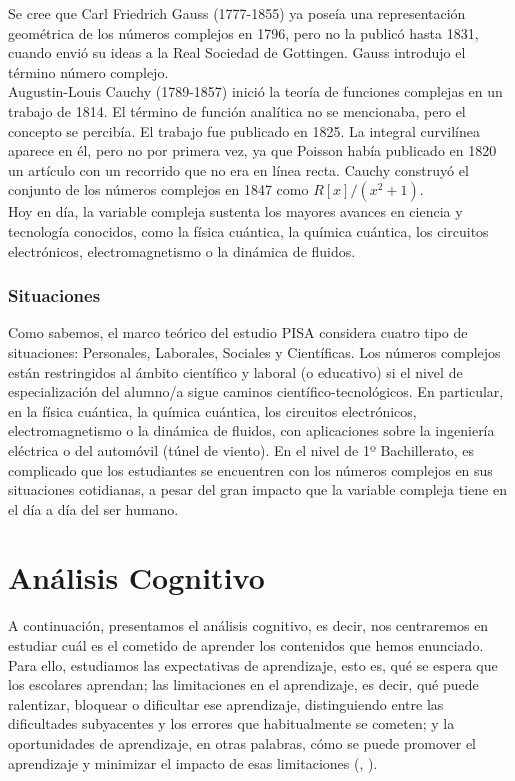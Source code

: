\documentclass[../main.tex]{memoir}
\begin{document}
Se cree que Carl Friedrich Gauss (1777-1855) ya poseía una representación geométrica de los números complejos en 1796, pero no la publicó hasta 1831, cuando envió su ideas a la Real Sociedad de Gottingen. Gauss introdujo el término número complejo. \\

Augustin-Louis Cauchy (1789-1857) inició la teoría de funciones complejas en un trabajo de 1814. El término de función analítica no se mencionaba, pero el concepto se percibía. El trabajo fue publicado en 1825. La integral curvilínea aparece en él, pero no por primera vez, ya que Poisson había publicado en 1820 un artículo con un recorrido que no era en línea recta. Cauchy construyó el conjunto de los números complejos en 1847 como $R[x]/(x^2+1)$. \\

Hoy en día, la variable compleja sustenta los mayores avances en ciencia y tecnología conocidos, como la física cuántica, la química cuántica, los circuitos electrónicos, electromagnetismo o la  dinámica de fluidos.


\subsubsection{Situaciones}

Como sabemos, el marco teórico del estudio PISA considera cuatro tipo de situaciones: Personales, Laborales, Sociales y Científicas. Los números complejos están restringidos al ámbito científico y laboral (o educativo) si el nivel de especialización del alumno/a sigue caminos científico-tecnológicos. En particular, en la física cuántica, la química cuántica, los circuitos electrónicos, electromagnetismo o la dinámica de fluidos, con aplicaciones sobre la ingeniería eléctrica o del automóvil (túnel de viento). En el nivel de 1º Bachillerato, es complicado que los estudiantes se encuentren con los números complejos en sus situaciones cotidianas, a pesar del gran impacto que la variable compleja tiene en el día a día del ser humano.


\section{Análisis Cognitivo}

A continuación, presentamos el análisis cognitivo, es decir, nos centraremos en estudiar cuál es el cometido de aprender los contenidos que hemos enunciado. Para ello, estudiamos las expectativas de aprendizaje, esto es, qué se espera que los escolares aprendan; las limitaciones en el aprendizaje, es decir, qué puede ralentizar, bloquear o dificultar ese aprendizaje, distinguiendo entre las dificultades subyacentes y los errores que habitualmente se cometen; y la oportunidades de aprendizaje, en otras palabras, cómo se puede promover el aprendizaje y minimizar el impacto de esas limitaciones (\cite{rico2016}, \cite{lupi2013}).
\end{document}
